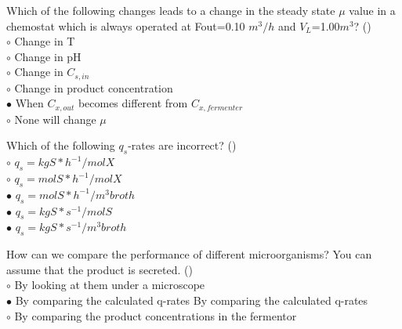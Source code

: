 \documentclass[]{beamer}
\begin{document}
\begin{frame}[shrink] {}
\addtocounter{questions}{1}
\color{blue}
Which of the following changes leads to a change in the steady state $\mu$ value in a chemostat which is always operated at Fout=0.10 $m^{3}/h$ and $V_L$=1.00$m^3$? ()\\
\color{black}
\setlength{\parindent}{-0.4cm}
{\color{red}$\circ$} Change in T\\
{\color{red}$\circ$} Change in pH\\
{\color{red}$\circ$} Change in $C_{s,in}$ \\
{\color{red}$\circ$} Change in product concentration\\
{\color{red}$\bullet$} When $C_{x,out}$ becomes different from $C_{x,fermenter}$ \\
{\color{red}$\circ$} None will change $\mu$\\
\end{frame}

\begin{frame}[shrink] {}
\addtocounter{questions}{1}
\color{blue}
Which of the following $q_s$-rates are incorrect? ()\\
\color{black}
\setlength{\parindent}{-0.4cm}
{\color{red}$\circ$} $q_s = kgS*h^{-1}/molX$ \\ 
{\color{red}$\circ$} $q_s = molS*h^{-1}/molX$ \\ 
{\color{red}$\bullet$} $q_s = molS*h^{-1}/m^{3}broth$ \\ 
{\color{red}$\bullet$} $q_s = kgS*s^{-1}/molS$ \\ 
{\color{red}$\bullet$} $q_s = kgS*s^{-1}/m^{3}broth$ \\ 
\end{frame}

\begin{frame}[shrink] {}
\addtocounter{questions}{1}
\color{blue}
How can we compare the performance of different microorganisms? You can assume that the product is secreted. ()\\
\color{black}
\setlength{\parindent}{-0.4cm}
{\color{red}$\circ$}  By looking at them under a microscope\\
{\color{red}$\bullet$} By comparing the calculated q-rates By comparing the calculated q-rates \\
{\color{red}$\circ$} By comparing the product concentrations in the fermentor \\
\end{frame}
\end{document}

